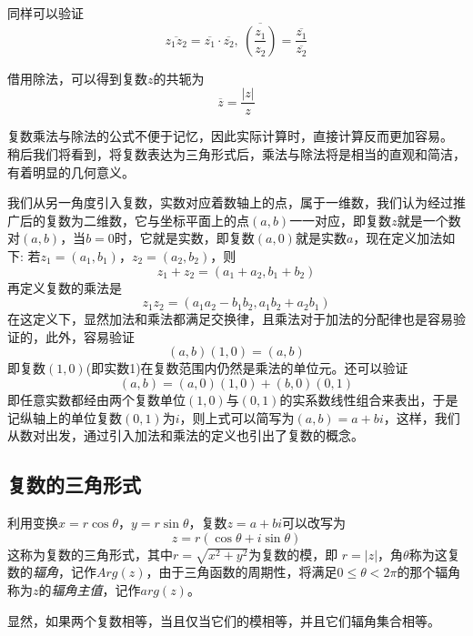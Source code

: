 同样可以验证
\[ \overline{z_1z_2} = \overline{z_1} \cdot \overline{z_2}, \  \overline{\left( \frac{z_1}{z_2} \right)} = \frac{\overline{z_1}}{\overline{z_2}} \]

借用除法，可以得到复数$z$的共轭为
\[ \overline{z}=\frac{|z|}{z} \]

复数乘法与除法的公式不便于记忆，因此实际计算时，直接计算反而更加容易。 稍后我们将看到，将复数表达为三角形式后，乘法与除法将是相当的直观和简洁，有着明显的几何意义。

\begin{example}[从数对引入复数]
  我们从另一角度引入复数，实数对应着数轴上的点，属于一维数，我们认为经过推广后的复数为二维数，它与坐标平面上的点$(a,b)$一一对应，即复数$z$就是一个数对$(a,b)$，当$b=0$时，它就是实数，即复数$(a,0)$就是实数$a$，现在定义加法如下: 若$z_1=(a_1,b_1)$，$z_2=(a_2,b_2)$，则
  \[ z_1 + z_2 = (a_1 + a_2, b_1 + b_2) \]
  再定义复数的乘法是
  \[ z_1z_2 = (a_1a_2-b_1b_2,a_1b_2+a_2b_1) \]
  在这定义下，显然加法和乘法都满足交换律，且乘法对于加法的分配律也是容易验证的，此外，容易验证
  \[ (a,b)(1,0) = (a,b) \]
  即复数$(1,0)$(即实数1)在复数范围内仍然是乘法的单位元。还可以验证
  \[ (a,b) = (a,0)(1,0) + (b,0)(0,1)  \]
  即任意实数都经由两个复数单位$(1,0)$与$(0,1)$的实系数线性组合来表出，于是记纵轴上的单位复数$(0,1)$为$i$，则上式可以简写为$(a,b)=a+bi$，这样，我们从数对出发，通过引入加法和乘法的定义也引出了复数的概念。
\end{example}

\subsection{复数的三角形式}
\label{sec:triangle-form-of-complex-number}



利用变换$x=r\cos{\theta}$，$y=r\sin{\theta}$，复数$z=a+bi$可以改写为
\[ z=r(\cos{\theta}+i\sin{\theta}) \]
这称为复数的三角形式，其中$r=\sqrt{x^2+y^2}$为复数的模，即 $r=|z|$，角$\theta$称为这复数的\emph{辐角}，记作$Arg(z)$，由于三角函数的周期性，将满足$0\leqslant \theta < 2\pi$的那个辐角称为$z$的\emph{辐角主值}，记作$arg(z)$。

显然，如果两个复数相等，当且仅当它们的模相等，并且它们辐角集合相等。

